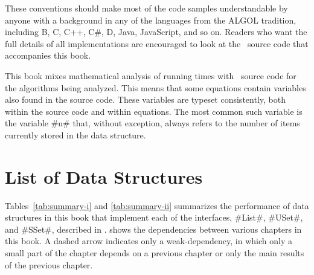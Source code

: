 These conventions should make most of the code samples understandable by
anyone with a background in any of the languages from the ALGOL tradition,
including B, C, C++, C\#, D, Java, JavaScript, and so on.  Readers who want
the full details of all implementations are encouraged to look at the
\lang\ source code that accompanies this book.

This book mixes mathematical analysis of running times with \lang\
source code for the algorithms being analyzed.  This means that
some equations contain variables also found in the source code.
These variables are typeset consistently, both within the source code
and within equations.  The most common such variable is the variable #n#
that, without exception, always refers to the number of items currently
stored in the data structure.

\section{List of Data Structures}

Tables~\ref{tab:summary-i} and \ref{tab:summary-ii} summarizes the
performance of data structures in this book that implement each of the
interfaces, #List#, #USet#, and #SSet#, described in .
\Figref{dependencies} shows the dependencies between various chapters in
this book.  A dashed arrow indicates only a weak-dependency, in which
only a small part of the chapter depends on a previous chapter or only
the main results of the previous chapter.

